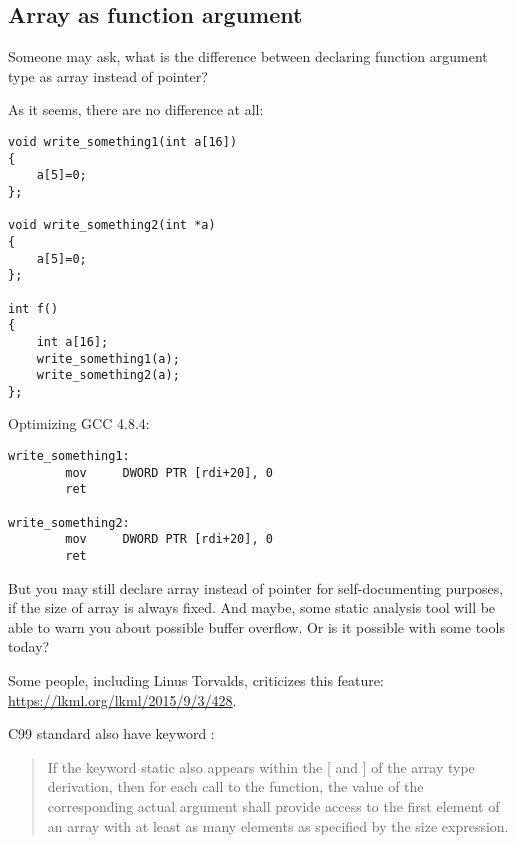 \subsection{Array as function argument}

Someone may ask, what is the difference between declaring function argument type as array instead of pointer?

As it seems, there are no difference at all:

\begin{lstlisting}
void write_something1(int a[16])
{
	a[5]=0;
};

void write_something2(int *a)
{
	a[5]=0;
};

int f()
{
	int a[16];
	write_something1(a);
	write_something2(a);
};
\end{lstlisting}

Optimizing GCC 4.8.4:

\begin{lstlisting}
write_something1:
        mov     DWORD PTR [rdi+20], 0
        ret

write_something2:
        mov     DWORD PTR [rdi+20], 0
        ret
\end{lstlisting}

But you may still declare array instead of pointer for self-documenting purposes, if the size of array is always fixed.
And maybe, some static analysis tool will be able to warn you about possible buffer overflow.
Or is it possible with some tools today?

Some people, including Linus Torvalds, criticizes this \CCpp feature: \url{https://lkml.org/lkml/2015/9/3/428}.

C99 standard also have  keyword :

\begin{framed}
\begin{quotation}
If the keyword static also appears  within the [ and ] of the array type derivation, then for each call to the function, the value of the corresponding actual argument shall provide access to the first element of an array with at least as many elements as specified by the size expression.
\end{quotation}
\end{framed}

